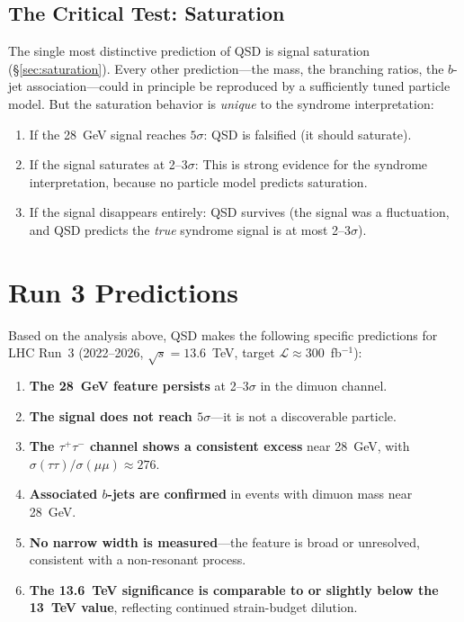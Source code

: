 \documentclass[11pt,a4paper]{article}
\theoremstyle{definition}
\theoremstyle{remark}
\begin{document}
\subsection{The Critical Test: Saturation}

The single most distinctive prediction of QSD is signal saturation (\S\ref{sec:saturation}). Every other prediction---the mass, the branching ratios, the $b$-jet association---could in principle be reproduced by a sufficiently tuned particle model. But the saturation behavior is \emph{unique} to the syndrome interpretation:

\begin{enumerate}[nosep]
\item If the 28~GeV signal reaches $5\sigma$: QSD is falsified (it should saturate).
\item If the signal saturates at 2--3$\sigma$: This is strong evidence for the syndrome interpretation, because no particle model predicts saturation.
\item If the signal disappears entirely: QSD survives (the signal was a fluctuation, and QSD predicts the \emph{true} syndrome signal is at most 2--3$\sigma$).
\end{enumerate}

\section{Run 3 Predictions}
\label{sec:run3}

Based on the analysis above, QSD makes the following specific predictions for LHC Run~3 (2022--2026, $\sqrt{s} = 13.6$~TeV, target $\mathcal{L} \approx 300$~fb$^{-1}$):

\begin{enumerate}
\item \textbf{The 28~GeV feature persists} at 2--3$\sigma$ in the dimuon channel.

\item \textbf{The signal does not reach $5\sigma$}---it is not a discoverable particle.

\item \textbf{The $\tau^+\tau^-$ channel shows a consistent excess} near 28~GeV, with $\sigma(\tau\tau)/\sigma(\mu\mu) \approx 276$.

\item \textbf{Associated $b$-jets are confirmed} in events with dimuon mass near 28~GeV.

\item \textbf{No narrow width is measured}---the feature is broad or unresolved, consistent with a non-resonant process.

\item \textbf{The 13.6~TeV significance is comparable to or slightly below the 13~TeV value}, reflecting continued strain-budget dilution.
\end{enumerate}
\end{document}
